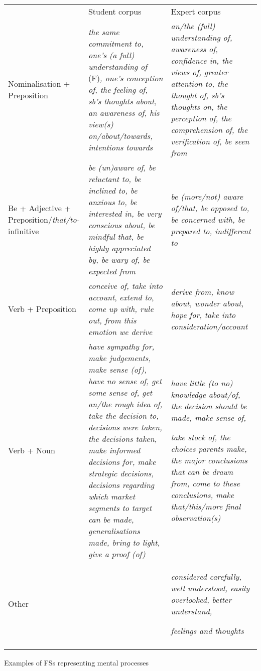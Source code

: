\documentclass[output=paper]{langsci/langscibook}
\begin{document}
\begin{tabularx}{\textwidth}{XXX} & Student corpus & Expert corpus\\

\lsptoprule
Nominalisation + Preposition & \textit{the same commitment to, one’s (a full) understanding of} (F)\textit{, one’s conception of, the feeling of, sb’s thoughts about, an awareness of, his view(s) on/about/towards, intentions towards} & \textit{an/the (full) understanding of, awareness of, confidence in, the views of, greater attention to, the thought of, sb’s thoughts on, the perception of, the comprehension of, the verification of, be seen from}\\
Be + Adjective + Preposition/\textit{that/to-}infinitive & \textit{be (un)aware of, be reluctant to, be inclined to, be anxious to, be interested in, be very conscious about, be mindful that, be highly appreciated by, be wary of, be expected from} & \textit{be (more/not) aware of/that, be opposed to, be concerned with, be prepared to, indifferent to}\\
Verb + Preposition & \textit{conceive of, take into account}, \textit{extend to}, \textit{come up with, rule out, from this emotion we derive} & \textit{derive from, know about, wonder about, hope for, take into consideration/account}\\
Verb + Noun & \textit{have sympathy for, make judgements, make sense (of), have no sense of, get some sense of, get an/the rough idea of, take the decision to, decisions were taken, the decisions taken, make informed decisions for, make strategic decisions, decisions regarding which market segments to target can be made, generalisations made, bring to light, give a proof (of)} & \textit{have little (to no) knowledge about/of, the decision should be made, make sense of,}

\textit{take stock of, the choices parents make, the major conclusions that can be drawn from, come to these conclusions, make that/this/more final observation(s)}\\
Other &  & \textit{considered carefully, well understood, easily overlooked, better understand,}

\textit{feelings and thoughts}\\
\lspbottomrule
\end{tabularx}
\begin{table}
\caption{Examples of FSs representing mental processes}
\label{tab:key:6}
\end{table}
\end{document}
